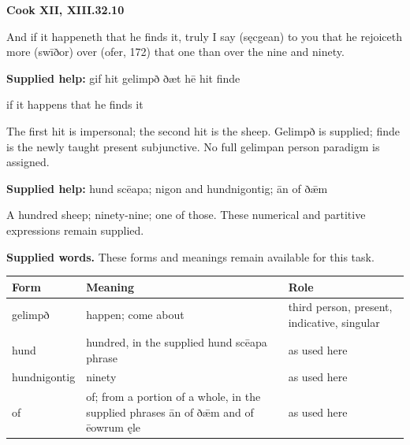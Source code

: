 \par\begin{minipage}{\linewidth}\raggedright
\textbf{Cook XII, XIII.32.10}

And if it happeneth that he finds it, truly I say (sęcgean) to you that he rejoiceth more (swīðor) over (ofer, 172) that one than over the nine and ninety.

\textbf{Supplied help:} gif hit gelimpð ðæt hē hit finde

if it happens that he finds it

The first hit is impersonal; the second hit is the sheep. Gelimpð is supplied; finde is the newly taught present subjunctive. No full gelimpan person paradigm is assigned.

\textbf{Supplied help:} hund scēapa; nigon and hundnigontig; ān of ðǣm

A hundred sheep; ninety-nine; one of those. These numerical and partitive expressions remain supplied.

\textbf{Supplied words.} These forms and meanings remain available for this task.

\par\begingroup
\fontsize{10.5}{13.2}\selectfont
\setlength{\LTleft}{0pt}\setlength{\LTright}{\fill}
\noindent
\begin{tabular}{@{}>{\raggedright\arraybackslash}p{24mm}>{\raggedright\arraybackslash}p{58mm}>{\raggedright\arraybackslash}p{36.38mm}@{}}
\toprule
\textbf{Form} & \textbf{Meaning} & \textbf{Role} \\
\midrule
gelimpð & happen; come about & third person, present, indicative, singular \\
hund & hundred, in the supplied hund scēapa phrase & as used here \\
hundnigontig & ninety & as used here \\
of & of; from a portion of a whole, in the supplied phrases ān of ðǣm and of ēowrum ęle & as used here \\
\bottomrule
\end{tabular}
\par\endgroup

\end{minipage}\par\addvspace{4pt}

